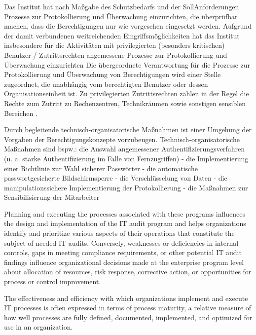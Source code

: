 Das Institut hat nach Maßgabe des Schutzbedarfs und der SollAnforderungen Prozesse zur Protokollierung und Überwachung einzurichten, die überprüfbar machen, dass die Berechtigungen nur wie
vorgesehen eingesetzt werden. Aufgrund der damit verbundenen
weitreichenden Eingriffsmöglichkeiten hat das Institut insbesondere
für die Aktivitäten mit privilegierten (besonders kritischen)
Benutzer-/ Zutrittsrechten angemessene Prozesse zur Protokollierung
und Überwachung einzurichten
Die übergeordnete Verantwortung für die Prozesse zur Protokollierung und
Überwachung von Berechtigungen wird einer Stelle zugeordnet, die unabhängig vom berechtigten Benutzer oder dessen Organisationseinheit ist. Zu
privilegierten Zutrittsrechten zählen in der Regel die Rechte zum Zutritt zu
Rechenzentren, Technikräumen sowie sonstigen sensiblen Bereichen \citep{BaFinZAIT}.

Durch begleitende technisch-organisatorische Maßnahmen ist einer
Umgehung der Vorgaben der Berechtigungskonzepte vorzubeugen.
Technisch-organisatorische Maßnahmen sind bspw.:
die Auswahl angemessener Authentifizierungsverfahren (u. a. starke
Authentifizierung im Falle von Fernzugriffen)
- die Implementierung einer Richtlinie zur Wahl sicherer Passwörter
- die automatische passwortgesicherte Bildschirmsperre
- die Verschlüsselung von Daten
- die manipulationssichere Implementierung der Protokollierung
- die Maßnahmen zur Sensibilisierung der Mitarbeiter

Planning
and executing the processes associated with these programs influences the design
and implementation of the IT audit program and helps organizations identify and
prioritize various aspects of their operations that constitute the subject of needed
IT audits. Conversely, weaknesses or deficiencies in internal controls, gaps in
meeting compliance requirements, or other potential IT audit findings influence
organizational decisions made at the enterprise program level about allocation of
resources, risk response, corrective action, or opportunities for process or control
improvement.


The effectiveness and efficiency with which organizations implement and execute
IT processes is often expressed in terms of process maturity, a relative measure of
how well processes are fully defined, documented, implemented, and optimized
for use in an organization.

